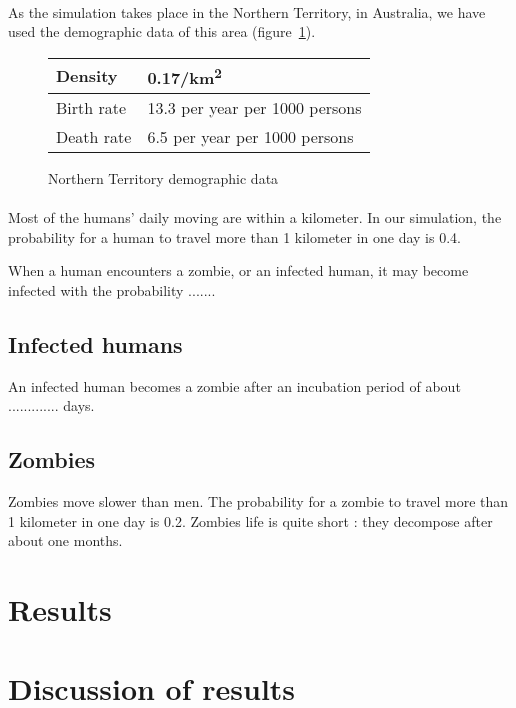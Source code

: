 \documentclass{report}
\begin{document}
\paragraph{}
As the simulation takes place in the Northern Territory, in Australia, we have used the demographic data of this area (figure~\ref{AustralianData}).
\begin{figure}[!h]
    \begin{tabular}{|l|l|}
      \hline
        Density    & 0.17/km\textsuperscript{2} \\
      \hline
        Birth rate & 13.3 per year per 1000 persons \\
      \hline
        Death rate & 6.5 per year per 1000 persons \\
      \hline
\end{tabular}
\caption{Northern Territory demographic data}\label{AustralianData}
\end{figure}

\paragraph{}
Most of the humans' daily moving are within a kilometer. In our simulation, the probability for a human to travel more than 1 kilometer in one day is 0.4.

When a human encounters a zombie, or an infected human, it may become infected with the probability ....... %

\subsection{Infected humans}
An infected human becomes a zombie after an incubation period of about ............. days. %

\subsection{Zombies}
Zombies move slower than men. The probability for a zombie to travel more than 1 kilometer in one day is 0.2.
Zombies life is quite short : they decompose after about one months.




\section{Results}


\section{Discussion of results}
\end{document}
